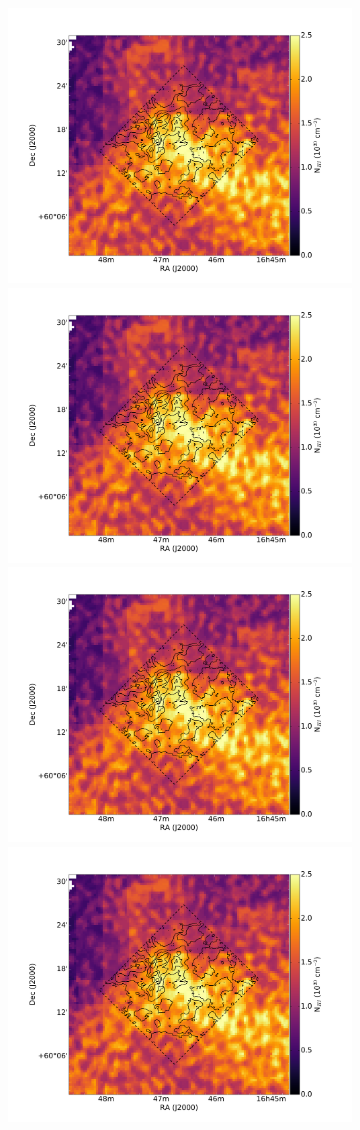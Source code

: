 \documentclass[traditabstract]{aa}
\begin{document}
\begin{figure}[h!]
  \centering
  \includegraphics[page=1,width=9.1cm,trim=65 30 125 75,clip=true]{Figures/HI-CO.pdf}
  \includegraphics[page=2,width=9.1cm,trim=65 30 125 75,clip=true]{Figures/HI-CO.pdf} \\
  \includegraphics[page=3,width=9.1cm,trim=65 30 125 75,clip=true]{Figures/HI-CO.pdf}
  \includegraphics[page=4,width=9.1cm,trim=65 30 125 75,clip=true]{Figures/HI-CO.pdf} \\

\end{figure}
\end{document}
